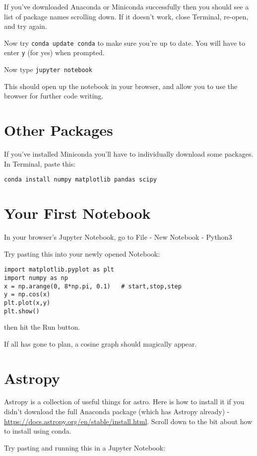 \documentclass{article}
\newcommand{\code}[1]{\colorbox{light-gray}{\texttt{#1}}}
\begin{document}
If you've downloaded Anaconda or Miniconda successfully then you should see a list of package names scrolling down. If it doesn't work, close Terminal, re-open, and try again.

Now try \code{conda update conda} to make sure you're up to date. You will have to enter \code{y} (for yes) when prompted. 

Now type \code{jupyter notebook}

This should open up the notebook in your browser, and allow you to use the browser for further code writing. 

\section{Other Packages}
If you've installed Miniconda you'll have to individually download some packages. In Terminal, paste this:

\code{conda install numpy matplotlib pandas scipy}

\section{Your First Notebook}
In your browser's Jupyter Notebook, go to File - New Notebook - Python3

Try pasting this into your newly opened Notebook:

\begin{verbatim}
import matplotlib.pyplot as plt
import numpy as np
x = np.arange(0, 8*np.pi, 0.1)   # start,stop,step
y = np.cos(x)
plt.plot(x,y)
plt.show()
\end{verbatim}
then hit the Run button. 

If all has gone to plan, a cosine graph should magically appear. 

\section{Astropy}

Astropy is a collection of useful things for astro. Here is how to install it if you didn't download the full Anaconda package (which has Astropy already) - \url{https://docs.astropy.org/en/stable/install.html}. Scroll down to the bit about how to install using conda. 

Try pasting and running this in a Jupyter Notebook:
\end{document}
